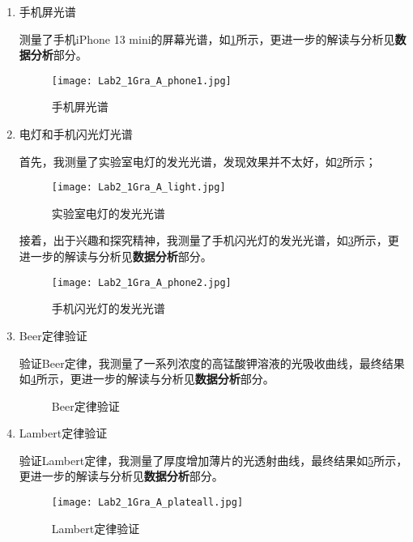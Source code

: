 \documentclass[dvipsnames, svgnames,a4paper,11pt]{article}
\begin{document}
\begin{enumerate}
		\item 手机屏光谱
		
		测量了手机iPhone 13 mini的屏幕光谱，如\cref{fig:figA6}所示，更进一步的解读与分析见\textbf{数据分析}部分。
		
		\begin{figure}[htbp]
			\centering
			\texttt{[image: Lab2\_1Gra\_A\_phone1.jpg]}
			\caption{手机屏光谱}
			\label{fig:figA6}
		\end{figure}
		
		\clearpage
		\item 电灯和手机闪光灯光谱
		
		首先，我测量了实验室电灯的发光光谱，发现效果并不太好，如\cref{fig:figA7}所示；
		
		\begin{figure}[htbp]
			\centering
			\texttt{[image: Lab2\_1Gra\_A\_light.jpg]}
			\caption{实验室电灯的发光光谱}
			\label{fig:figA7}
		\end{figure}
		
		接着，出于兴趣和探究精神，我测量了手机闪光灯的发光光谱，如\cref{fig:figA8}所示，更进一步的解读与分析见\textbf{数据分析}部分。
		
		\begin{figure}[htbp]
			\centering
			\texttt{[image: Lab2\_1Gra\_A\_phone2.jpg]}
			\caption{手机闪光灯的发光光谱}
			\label{fig:figA8}
		\end{figure}
		
		\clearpage
		\item Beer定律验证
		
		验证Beer定律，我测量了一系列浓度的高锰酸钾溶液的光吸收曲线，最终结果如\cref{fig:figA9}所示，更进一步的解读与分析见\textbf{数据分析}部分。
		
		\begin{figure}[htbp]
			\centering
			\caption{Beer定律验证}
			\label{fig:figA9}			
		\end{figure}
		
		\item Lambert定律验证
		
		验证Lambert定律，我测量了厚度增加薄片的光透射曲线，最终结果如\cref{fig:figA10}所示，更进一步的解读与分析见\textbf{数据分析}部分。
		
		\begin{figure}[htbp]
			\centering
			\texttt{[image: Lab2\_1Gra\_A\_plateall.jpg]}
			\caption{Lambert定律验证}
			\label{fig:figA10}
		\end{figure}
		
	\end{enumerate}
	
\end{document}
